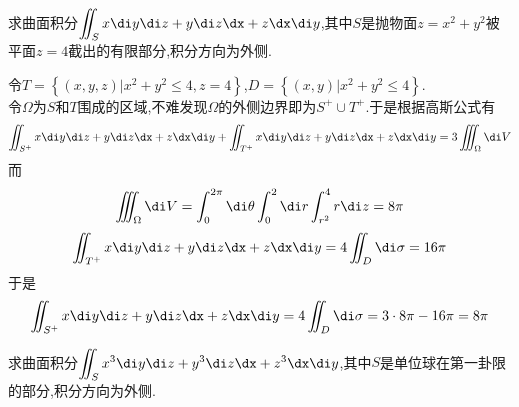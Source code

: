 \documentclass{ctexart}
\begin{document}
\pagestyle{empty}
\begin{center}
    \large{}
\end{center}
\begin{problem}[L.6.1]
    求曲面积分$\displaystyle\iint_{S}x\di y\di z+y\di z\dx+z\dx\di y$,其中$S$是抛物面$z=x^2+y^2$被平面$z=4$截出的有限部分,积分方向为外侧.
\end{problem}
\begin{solution}
    令$T=\left\{(x,y,z)|x^2+y^2\leqslant4,z=4\right\}$,$D=\left\{(x,y)|x^2+y^2\leqslant4\right\}$.\\
    令$\Omega$为$S$和$T$围成的区域,不难发现$\Omega$的外侧边界即为$S^+\cup T^+$.于是根据高斯公式有
    \[\iint_{S^+}x\di y\di z+y\di z\dx+z\dx\di y+\iint_{T^+}x\di y\di z+y\di z\dx+z\dx\di y=3\iiint_{\Omega}\di V\]
    而
    \[\iiint_{\Omega}\di V=\int_{0}^{2\pi}\di\theta\int_{0}^{2}\di r\int_{r^2}^{4}r\di z=8\pi\]
    \[\iint_{T^+}x\di y\di z+y\di z\dx+z\dx\di y=4\iint_{D}\di\sigma=16\pi\]
    于是
    \[\iint_{S^+}x\di y\di z+y\di z\dx+z\dx\di y=4\iint_{D}\di\sigma=3\cdot8\pi-16\pi=8\pi\]
\end{solution}
\begin{problem}[L.6.2]
    求曲面积分$\displaystyle\iint_{S}x^3\di y\di z+y^3\di z\dx+z^3\dx\di y$,其中$S$是单位球在第一卦限的部分,积分方向为外侧.
\end{problem}
\end{document}
